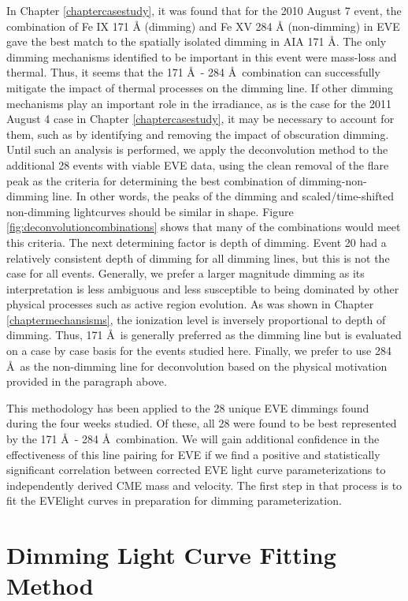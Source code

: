 In Chapter \ref{chaptercasestudy}, it was found that for the 2010 August 7 event, the combination of Fe IX 171 Å (dimming) and Fe XV 284 Å (non-dimming) in EVE gave the best match to the spatially isolated dimming in AIA 171 \AA. The only dimming mechanisms identified to be important in this event were mass-loss and thermal. Thus, it seems that the 171 \AA\ - 284 \AA\ combination can successfully mitigate the impact of thermal processes on the dimming line. If other dimming mechanisms play an important role in the irradiance, as is the case for the 2011 August 4 case in Chapter \ref{chaptercasestudy}, it may be necessary to account for them, such as by identifying and removing the impact of obscuration dimming. Until such an analysis is performed, we apply the deconvolution method to the additional 28 events with viable EVE data, using the clean removal of the flare peak as the criteria for determining the best combination of dimming-non-dimming line. In other words, the peaks of the dimming and scaled/time-shifted non-dimming lightcurves should be similar in shape. Figure \ref{fig:deconvolutioncombinations} shows that many of the combinations would meet this criteria. The next determining factor is depth of dimming. Event 20 had a relatively consistent depth of dimming for all dimming lines, but this is not the case for all events. Generally, we prefer a larger magnitude dimming as its interpretation is less ambiguous and less susceptible to being dominated by other physical processes such as active region evolution. As was shown in Chapter \ref{chaptermechansisms}, the ionization level is inversely proportional to depth of dimming. Thus, 171 \AA\ is generally preferred as the dimming line but is evaluated on a case by case basis for the events studied here. Finally, we prefer to use 284 \AA\ as the non-dimming line for deconvolution based on the physical motivation provided in the paragraph above. 

This methodology has been applied to the 28 unique EVE dimmings found during the four weeks studied. Of these, all 28 were found to be best represented by the 171 \AA\ - 284 \AA\ combination. We will gain additional confidence in the effectiveness of this line pairing for EVE if we find a positive and statistically significant correlation between corrected EVE light curve parameterizations to independently derived CME mass and velocity. The first step in that process is to fit the EVElight curves in preparation for dimming parameterization. 

\section{Dimming Light Curve Fitting Method}
\label{sec:fittingmethod}

